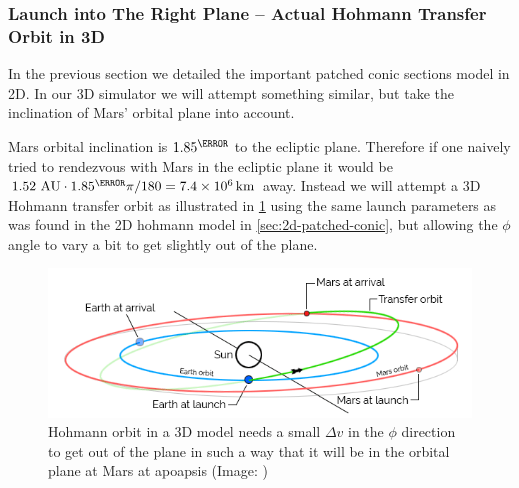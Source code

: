 \subsubsection{Launch into The Right Plane – Actual Hohmann Transfer Orbit in 3D}
In the previous section we detailed the important patched conic sections model in 2D. In our 3D simulator we will attempt something similar, but take the inclination of Mars' orbital plane into account.

Mars orbital inclination is $1.85^\degree$ to the ecliptic plane. Therefore if one naively tried to rendezvous with Mars in the ecliptic plane it would be \( 1.52\ \text{AU} \cdot 1.85^\degree \pi / 180 = \SI{7.4e6}{\km} \) away. Instead we will attempt a 3D Hohmann transfer orbit as illustrated in \cref{fig:hohmann-transfer-orbit-3D} using the same launch parameters as was found in the 2D hohmann model in \cref{sec:2d-patched-conic}, but allowing the \(\phi\) angle to vary a bit to get slightly out of the plane.

\begin{figure}[ht]
    \centering
    \includegraphics[width=0.80\linewidth]{fig/hohmann-transfer-orbit-3D.png}
    \caption{Hohmann orbit in a 3D model needs a small $\Delta v$ in the $\phi$ direction to get out of the plane in such a way that it will be in the orbital plane at Mars at apoapsis (Image: \cite{Daedalis.de})}
    \label{fig:hohmann-transfer-orbit-3D}
\end{figure}
 